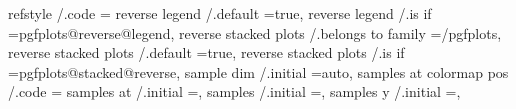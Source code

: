 {{{{{{{{{{{{{{{{{{{{{{{{{{{{{{{{{{{{{{{{{{refstyle                                     /.code                                                                                    ={%
reverse legend                               /.default                                                                                 =true,                                                                                                              
reverse legend                               /.is if                                                                                   =pgfplots@reverse@legend,                                                                                           
reverse stacked plots                        /.belongs to family                                                                       =/pgfplots,                                                                                                         
reverse stacked plots                        /.default                                                                                 =true,                                                                                                              
reverse stacked plots                        /.is if                                                                                   =pgfplots@stacked@reverse,                                                                                          
sample dim                                   /.initial                                                                                 =auto,                                                                                                              
samples at colormap pos                      /.code                                                                                    ={%
samples at                                   /.initial                                                                                 =,%
samples                                      /.initial                                                                                 =,%
samples y                                    /.initial                                                                                 =,%
}}}}}}}}}}}}}}}}}}}}}}}}}}}}}}}}}}}}}}}}}}}}
